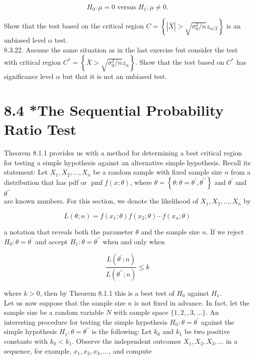 $$
H_{0}: \mu=0 \text { versus } H_{1}: \mu \neq 0 .
$$

Show that the test based on the critical region $C=\left\{|\bar{X}|>\sqrt{\sigma_{0}^{2} / n} z_{\alpha / 2}\right\}$ is an unbiased level $\alpha$ test.\\
8.3.22. Assume the same situation as in the last exercise but consider the test with critical region $C^{*}=\left\{\bar{X}>\sqrt{\sigma_{0}^{2} / n} z_{\alpha}\right\}$. Show that the test based on $C^{*}$ has significance level $\alpha$ but that it is not an unbiased test.

\section*{8.4 *The Sequential Probability Ratio Test}
Theorem 8.1.1 provides us with a method for determining a best critical region for testing a simple hypothesis against an alternative simple hypothesis. Recall its statement: Let $X_{1}, X_{2}, \ldots, X_{n}$ be a random sample with fixed sample size $n$ from a distribution that has pdf or $\operatorname{pmf} f(x ; \theta)$, where $\theta=\left\{\theta: \theta=\theta^{\prime}, \theta^{\prime \prime}\right\}$ and $\theta^{\prime}$ and $\theta^{\prime \prime}$\\
are known numbers. For this section, we denote the likelihood of $X_{1}, X_{2}, \ldots, X_{n}$ by

$$
L(\theta ; n)=f\left(x_{1} ; \theta\right) f\left(x_{2} ; \theta\right) \cdots f\left(x_{n} ; \theta\right)
$$

a notation that reveals both the parameter $\theta$ and the sample size $n$. If we reject $H_{0}: \theta=\theta^{\prime}$ and accept $H_{1}: \theta=\theta^{\prime \prime}$ when and only when

$$
\frac{L\left(\theta^{\prime} ; n\right)}{L\left(\theta^{\prime \prime} ; n\right)} \leq k
$$

where $k>0$, then by Theorem 8.1.1 this is a best test of $H_{0}$ against $H_{1}$.\\
Let us now suppose that the sample size $n$ is not fixed in advance. In fact, let the sample size be a random variable $N$ with sample space $\{1,2,, 3, \ldots\}$. An interesting procedure for testing the simple hypothesis $H_{0}: \theta=\theta^{\prime}$ against the simple hypothesis $H_{1}: \theta=\theta^{\prime \prime}$ is the following: Let $k_{0}$ and $k_{1}$ be two positive constants with $k_{0}<k_{1}$. Observe the independent outcomes $X_{1}, X_{2}, X_{3}, \ldots$ in a sequence, for example, $x_{1}, x_{2}, x_{3}, \ldots$, and compute

